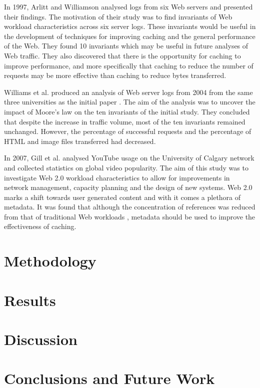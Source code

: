 \documentclass[10pt,conference]{IEEEtran}
\begin{document}
In 1997, Arlitt and Williamson \cite{keynote} analysed logs from six Web servers and presented their findings. The motivation of their study was to find invariants of Web workload characteristics across six server logs. These invariants would be useful in the development of techniques for improving caching and the general performance of the Web. They found 10 invariants which may be useful in future analyses of Web traffic. They also discovered that there is the opportunity for caching to improve performance, and more specifically that caching to reduce the number of requests may be more effective than caching to reduce bytes transferred.

Williams et al. \cite{williams05} produced an analysis of Web server logs from 2004 from the same three universities as the initial paper \cite{keynote}. The aim of the analysis was to uncover the impact of Moore's law on the ten invariants of the initial study. They concluded that despite the increase in traffic volume, most of the ten invariants remained unchanged. However, the percentage of successful requests and the percentage of HTML and image files transferred had decreased. 

In 2007, Gill et al. \cite{youtube} analysed YouTube usage on the University of Calgary network and collected statistics on global video popularity. The aim of this study was to investigate Web 2.0 workload characteristics to allow for improvements in network management, capacity planning and the design of new systems. Web 2.0 marks a shift towards user generated content and with it comes a plethora of metadata. It was found that although the concentration of references was reduced from that of traditional Web workloads \cite{keynote}, metadata should be used to improve the effectiveness of caching.

\section{Methodology}

\section{Results}

\section{Discussion}

\section{Conclusions and Future Work}



\end{document}
